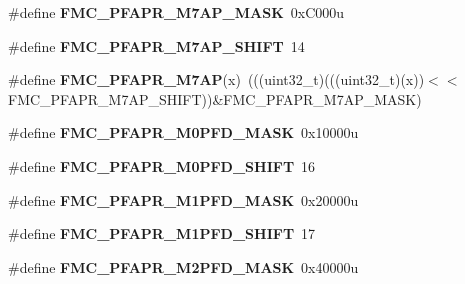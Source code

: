 \begin{DoxyCompactItemize}
\item 
\#define {\bfseries F\+M\+C\+\_\+\+P\+F\+A\+P\+R\+\_\+\+M7\+A\+P\+\_\+\+M\+A\+SK}~0x\+C000u\hypertarget{group__FMC__Register__Masks_ga87c7451b98f752717c6122892b4fc9a9}{}\label{group__FMC__Register__Masks_ga87c7451b98f752717c6122892b4fc9a9}

\item 
\#define {\bfseries F\+M\+C\+\_\+\+P\+F\+A\+P\+R\+\_\+\+M7\+A\+P\+\_\+\+S\+H\+I\+FT}~14\hypertarget{group__FMC__Register__Masks_ga8117d628a5889cb4983db0cc892e669c}{}\label{group__FMC__Register__Masks_ga8117d628a5889cb4983db0cc892e669c}

\item 
\#define {\bfseries F\+M\+C\+\_\+\+P\+F\+A\+P\+R\+\_\+\+M7\+AP}(x)~(((uint32\+\_\+t)(((uint32\+\_\+t)(x))$<$$<$F\+M\+C\+\_\+\+P\+F\+A\+P\+R\+\_\+\+M7\+A\+P\+\_\+\+S\+H\+I\+FT))\&F\+M\+C\+\_\+\+P\+F\+A\+P\+R\+\_\+\+M7\+A\+P\+\_\+\+M\+A\+SK)\hypertarget{group__FMC__Register__Masks_ga9b319489763e3896418dc291ca062b1e}{}\label{group__FMC__Register__Masks_ga9b319489763e3896418dc291ca062b1e}

\item 
\#define {\bfseries F\+M\+C\+\_\+\+P\+F\+A\+P\+R\+\_\+\+M0\+P\+F\+D\+\_\+\+M\+A\+SK}~0x10000u\hypertarget{group__FMC__Register__Masks_ga5f6efa8c02f2a2f04d5b62f8de35e9a9}{}\label{group__FMC__Register__Masks_ga5f6efa8c02f2a2f04d5b62f8de35e9a9}

\item 
\#define {\bfseries F\+M\+C\+\_\+\+P\+F\+A\+P\+R\+\_\+\+M0\+P\+F\+D\+\_\+\+S\+H\+I\+FT}~16\hypertarget{group__FMC__Register__Masks_ga5d7609bb54910d8b7be4dc3b868c040c}{}\label{group__FMC__Register__Masks_ga5d7609bb54910d8b7be4dc3b868c040c}

\item 
\#define {\bfseries F\+M\+C\+\_\+\+P\+F\+A\+P\+R\+\_\+\+M1\+P\+F\+D\+\_\+\+M\+A\+SK}~0x20000u\hypertarget{group__FMC__Register__Masks_ga3288aee0551874c34ce18211489a5f74}{}\label{group__FMC__Register__Masks_ga3288aee0551874c34ce18211489a5f74}

\item 
\#define {\bfseries F\+M\+C\+\_\+\+P\+F\+A\+P\+R\+\_\+\+M1\+P\+F\+D\+\_\+\+S\+H\+I\+FT}~17\hypertarget{group__FMC__Register__Masks_gaf51c3aa2255cc9c8efe5c2a705593f8f}{}\label{group__FMC__Register__Masks_gaf51c3aa2255cc9c8efe5c2a705593f8f}

\item 
\#define {\bfseries F\+M\+C\+\_\+\+P\+F\+A\+P\+R\+\_\+\+M2\+P\+F\+D\+\_\+\+M\+A\+SK}~0x40000u\hypertarget{group__FMC__Register__Masks_ga25320b4377f5b7137bece86c278122a4}{}\label{group__FMC__Register__Masks_ga25320b4377f5b7137bece86c278122a4}


\end{DoxyCompactItemize}
